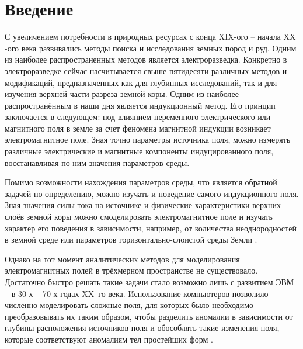 \chapter*{Введение}


С увеличением потребности в природных ресурсах с конца $\text{XIX}$-ого -- начала $\text{XX}$-ого века развивались методы поиска и исследования земных пород и руд. Одним из наиболее распространенных методов является электроразведка. Конкретно в электроразведке сейчас насчитывается свыше пятидесяти различных методов и модификаций, предназначенных как для глубинных исследований, так и для изучения верхней части разреза земной коры. Одним из наиболее распространённым в наши дня является индукционный метод. Его принцип заключается в следующем: под влиянием переменного электрического или магнитного поля в земле за счет феномена магнитной индукции возникает электромагнитное поле. Зная точно параметры источника поля, можно измерять различные электрические и магнитные компоненты индуцированного поля, восстанавливая по ним значения параметров среды.

Помимо возможности нахождения параметров среды, что является обратной задачей по определению, можно изучать и поведение самого индукционного поля. Зная значения силы тока на источнике и физические характеристики верхних слоёв земной коры можно смоделировать электромагнитное поле и изучать характер его поведения в зависимости, например, от количества неоднородностей в земной среде или параметров горизонтально-слоистой среды Земли \cite{1}.

Однако на тот момент аналитических методов для моделирования электромагнитных полей в трёхмерном пространстве не существовало. Достаточно быстро решать такие задачи стало возможно лишь с развитием ЭВМ -- в 30-х -- 70-х годах $\text{XX}$--го века. Использование компьютеров позволило численно моделировать сложные поля, для которых было необходимо преобразовывать их таким образом, чтобы разделить аномалии в зависимости от глубины расположения источников поля и обособлять такие изменения поля, которые соответствуют аномалиям тел простейших форм \cite{2}. 

